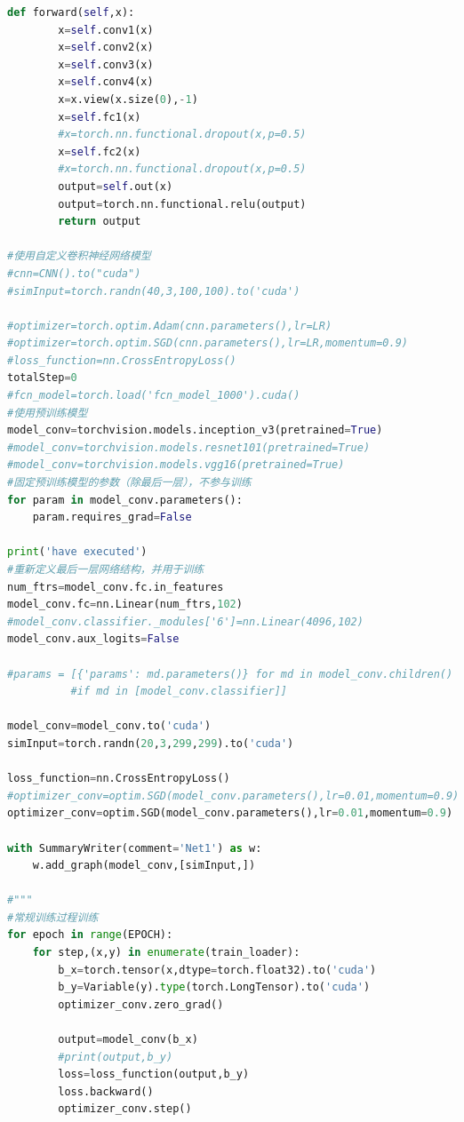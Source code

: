 \documentclass[supercite]{HustGraduPaper}
\begin{document}
\begin{sloppypar}
\begin{appendices}
\begin{spacing}{1.25}
\begin{lstlisting}[language=python]
    def forward(self,x):
        x=self.conv1(x)
        x=self.conv2(x)
        x=self.conv3(x)
        x=self.conv4(x)
        x=x.view(x.size(0),-1)
        x=self.fc1(x)
        #x=torch.nn.functional.dropout(x,p=0.5)
        x=self.fc2(x)
        #x=torch.nn.functional.dropout(x,p=0.5)
        output=self.out(x)
        output=torch.nn.functional.relu(output)
        return output

#使用自定义卷积神经网络模型
#cnn=CNN().to("cuda")
#simInput=torch.randn(40,3,100,100).to('cuda')

#optimizer=torch.optim.Adam(cnn.parameters(),lr=LR)
#optimizer=torch.optim.SGD(cnn.parameters(),lr=LR,momentum=0.9)
#loss_function=nn.CrossEntropyLoss()
totalStep=0
#fcn_model=torch.load('fcn_model_1000').cuda()
#使用预训练模型
model_conv=torchvision.models.inception_v3(pretrained=True)
#model_conv=torchvision.models.resnet101(pretrained=True)
#model_conv=torchvision.models.vgg16(pretrained=True)
#固定预训练模型的参数（除最后一层），不参与训练
for param in model_conv.parameters():
    param.requires_grad=False

print('have executed')
#重新定义最后一层网络结构，并用于训练
num_ftrs=model_conv.fc.in_features
model_conv.fc=nn.Linear(num_ftrs,102)
#model_conv.classifier._modules['6']=nn.Linear(4096,102)
model_conv.aux_logits=False

#params = [{'params': md.parameters()} for md in model_conv.children()
          #if md in [model_conv.classifier]]

model_conv=model_conv.to('cuda')
simInput=torch.randn(20,3,299,299).to('cuda')

loss_function=nn.CrossEntropyLoss()
#optimizer_conv=optim.SGD(model_conv.parameters(),lr=0.01,momentum=0.9)
optimizer_conv=optim.SGD(model_conv.parameters(),lr=0.01,momentum=0.9)

with SummaryWriter(comment='Net1') as w:
    w.add_graph(model_conv,[simInput,])

#"""
#常规训练过程训练
for epoch in range(EPOCH):
    for step,(x,y) in enumerate(train_loader):
        b_x=torch.tensor(x,dtype=torch.float32).to('cuda')
        b_y=Variable(y).type(torch.LongTensor).to('cuda')
        optimizer_conv.zero_grad()

        output=model_conv(b_x)
        #print(output,b_y)
        loss=loss_function(output,b_y)
        loss.backward()
        optimizer_conv.step()


\end{lstlisting}
\end{spacing}
\end{appendices}
\end{sloppypar}
\end{document}
